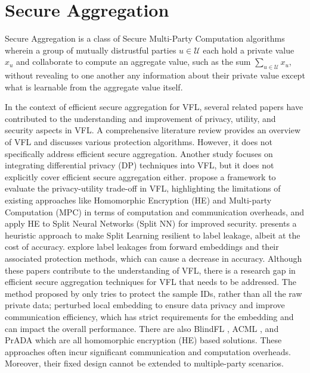 \documentclass[withindex,glossary,firstyr]{cam-thesis}
\begin{document}
\section{Secure Aggregation}

Secure Aggregation is a class of Secure Multi-Party Computation algorithms wherein a group of mutually distrustful parties $u \in \mathcal{U}$ each hold a private value $x_u$ and collaborate to compute an aggregate value, such as the sum $\sum_{u \in \mathcal{U}} x_u$, without revealing to one another any information about their private value except what is learnable from the aggregate value itself. 

In the context of efficient secure aggregation for VFL, several related papers have contributed to the understanding and improvement of privacy, utility, and security aspects in VFL. A comprehensive literature review \citep{vfl} provides an overview of VFL and discusses various protection algorithms. However, it does not specifically address efficient secure aggregation. Another study \citep{dpvfl} focuses on integrating differential privacy (DP) techniques into VFL, but it does not explicitly cover efficient secure aggregation either. 
\citet{tradeoffvfl} propose a framework to evaluate the privacy-utility trade-off in VFL, highlighting the limitations of existing approaches like Homomorphic Encryption (HE) and Multi-party Computation (MPC) in terms of computation and communication overheads, and \citet{cai2023secure} apply HE to Split Neural Networks (Split NN) for improved security. \citet{zheng2022making} presents a heuristic approach to make Split Learning resilient to label leakage, albeit at the cost of accuracy. \citet{sun2022label} explore label leakages from forward embeddings and their associated protection methods, which can cause a decrease in accuracy. Although these papers contribute to the understanding of VFL, there is a research gap in efficient secure aggregation techniques for VFL that needs to be addressed. The method proposed by \citet{liu2020asymmetrical} only tries to protect the sample IDs, rather than all the raw private data; \citet{chen2020vafl} perturbed local embedding to ensure data privacy and improve communication efficiency, which has strict requirements for the embedding and can impact the overall performance. There are also BlindFL \citep{fu2022blindfl}, ACML \citep{zhang2020acml}, and PrADA \citep{ kang2022prada} which are all homomorphic encryption (HE) based solutions. These approaches often incur significant communication and computation overheads. Moreover, their fixed design cannot be extended to multiple-party scenarios.
\end{document}

